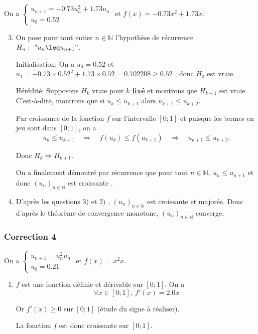 \documentclass[15pt, mathserif]{beamer}
\begin{document}
\begin{frame}On a $\begin{cases} u_{n+1} = -0.73u_n^2+1.73u_n\\[1em] u_0 = 0.52\end{cases}$ et $f(x) = -0.73x^2+1.73x$.

\begin{enumerate}\setcounter{enumi}{2}

	\item On pose pour tout entier $n \in \mathbb{N}$ l'hypothèse de récurrence $H_n:~" u_n \leq u_{n+1}"$.

\medskip

Initialisation: On a $u_0 =0.52$ et $u_1 = -0.73\times0.52^2+1.73\times0.52 = 0.702208\geq 0.52$ , donc $H_0$ est vraie.

\medskip

Hérédité: Supposons $H_k$ vraie pour \textbf\underline{{$k$ fixé}} et montrons que $H_{k+1}$ est vraie. C'est-à-dire, montrons que si $u_k \leq  u_{k+1}$ alors $u_{k+1} \leq  u_{k+2}$.

 Par croissance de la fonction $f$ sur l'intervalle $[0;1]$ et puisque les termes en jeu sont dans $[0;1]$, on a \[ u_k \leq u_{k+1} \quad \Rightarrow \quad f(u_k) \leq  f(u_{k+1}) \quad \Rightarrow \quad  u_{k+1}\leq u_{k+2}. \]

Donc $H_{k} \Rightarrow H_{k+1}$.

 On a finalement démontré par récurrence que pour tout $n \in\mathbb{N},~ u_n \leq u_{n+1}$ et donc $(u_n)_{n\in\mathbb{N}}$ est  croissante .

\end{enumerate}
\end{frame}


\begin{frame}

\begin{enumerate}\setcounter{enumi}{3}

	\item D'après les questions $3)$ et $2)$ , $(u_n)_{n\in\mathbb{N}}$ est croissante et majorée. Donc d'après le théorème de convergence monotone, $(u_n)_{n\in\mathbb{N}}$ converge.

\end{enumerate}\end{frame}


\begin{frame}
\vspace{-10mm}
	\frametitle{Correction 4}
On a $\begin{cases} u_{n+1} = u_n^2u_n\\[1em] u_0 = 0.21\end{cases}$ et $f(x) = x^2x$.

\begin{enumerate}
	\item $f$ est une fonction définie et dérivable sur $[0;1]$. On a \[\forall x \in [0;1], ~ f'(x) = 2.0x\]

 Or $f'(x) \geq 0$ sur $[0;1]$ (étude du signe à réaliser). 

La fonction $f$ est donc croissante sur $[0;1]$.

\end{enumerate}
\end{frame}
\end{document}

